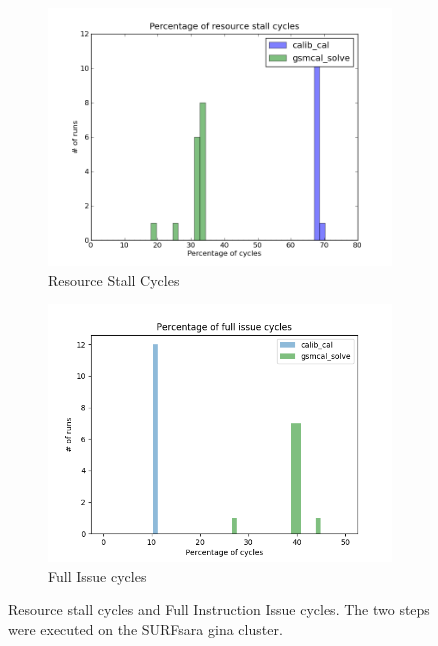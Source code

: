 \begin{figure}
  \centering
      \begin{subfigure}{.45\textwidth}
      \includegraphics[width=\textwidth]{ch4/figures/rstall.png}
      \caption{Resource Stall Cycles}
	\label{fig:rstall}
    \end{subfigure}
    \begin{subfigure}{.45\textwidth}
    \includegraphics[width=\textwidth]{ch4/figures/full_issue.png}
      \caption{Full Issue cycles }
	\label{fig:full_issue}
  \end{subfigure}
  \label{fig:rr}
  \caption{Resource stall cycles and Full Instruction Issue cycles. The two steps were  executed on the SURFsara gina cluster. }
\end{figure}

